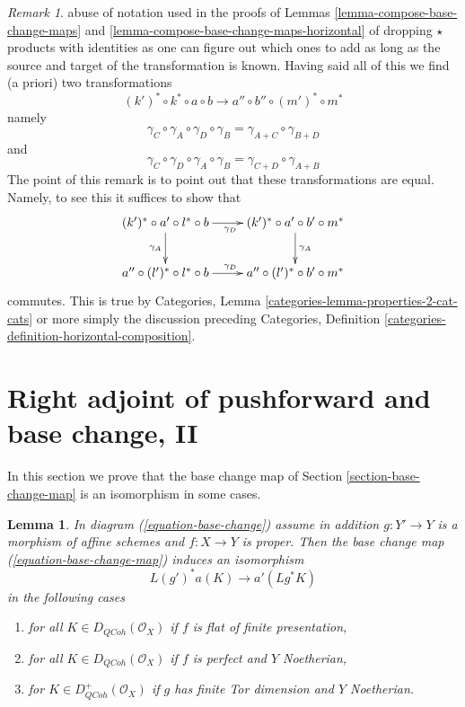\documentclass{stacks-project}
\theoremstyle{plain}
\newtheorem{lemma}[subsection]{Lemma}
\theoremstyle{definition}
\theoremstyle{remark}
\newtheorem{remark}[subsection]{Remark}
\numberwithin{equation}{subsection}
\def\QCoh{\mathit{QCoh}}
\begin{document}
\begin{remark}
abuse of notation used in the proofs of
Lemmas \ref{lemma-compose-base-change-maps} and
\ref{lemma-compose-base-change-maps-horizontal}
of dropping $\star$ products with identities as one can figure
out which ones to add as long as the source and target of the
transformation is known.
Having said all of this we find (a priori) two transformations
$$
(k')^* \circ k^* \circ a \circ b
\longrightarrow
a'' \circ b'' \circ (m')^* \circ m^*
$$
namely
$$
\gamma_C \circ \gamma_A \circ \gamma_D \circ \gamma_B =
\gamma_{A + C} \circ \gamma_{B + D}
$$
and
$$
\gamma_C \circ \gamma_D \circ \gamma_A \circ \gamma_B =
\gamma_{C + D} \circ \gamma_{A + B}
$$
The point of this remark is to point out that these transformations
are equal. Namely, to see this it suffices to show that
$$
\xymatrix{
(k')^* \circ a' \circ l^* \circ b \ar[r]_{\gamma_D} \ar[d]_{\gamma_A} &
(k')^* \circ a' \circ b' \circ m^* \ar[d]^{\gamma_A} \\
a'' \circ (l')^* \circ l^* \circ b \ar[r]^{\gamma_D} &
a'' \circ (l')^* \circ b' \circ m^*
}
$$
commutes. This is true by
Categories, Lemma \ref{categories-lemma-properties-2-cat-cats}
or more simply the discussion preceding
Categories, Definition \ref{categories-definition-horizontal-composition}.
\end{remark}








\section{Right adjoint of pushforward and base change, II}
\label{section-base-change-II}

\noindent
In this section we prove that the base change map of
Section \ref{section-base-change-map} is an isomorphism
in some cases.

\begin{lemma}
\label{lemma-more-base-change}
In diagram (\ref{equation-base-change}) assume in addition
$g : Y' \to Y$ is a morphism of affine schemes and $f : X \to Y$ is proper.
Then the base change map (\ref{equation-base-change-map}) induces an
isomorphism
$$
L(g')^*a(K) \longrightarrow a'(Lg^*K)
$$
in the following cases
\begin{enumerate}
\item for all $K \in D_\QCoh(\mathcal{O}_X)$ if $f$
is flat of finite presentation,
\item for all $K \in D_\QCoh(\mathcal{O}_X)$ if $f$
is perfect and $Y$ Noetherian,
\item for $K \in D_\QCoh^+(\mathcal{O}_X)$ if $g$ has finite Tor dimension
and $Y$ Noetherian.
\end{enumerate}
\end{lemma}
\end{document}
